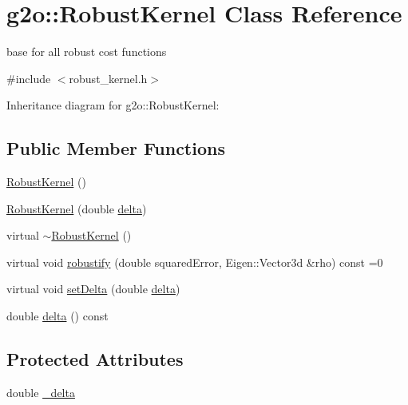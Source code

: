 \hypertarget{classg2o_1_1RobustKernel}{}\section{g2o\+:\+:Robust\+Kernel Class Reference}
\label{classg2o_1_1RobustKernel}


base for all robust cost functions  




{\ttfamily \#include $<$robust\+\_\+kernel.\+h$>$}



Inheritance diagram for g2o\+:\+:Robust\+Kernel\+:
\subsection*{Public Member Functions}
\begin{DoxyCompactItemize}
\item 
\hyperlink{classg2o_1_1RobustKernel_ae4f7b1e9d0c9925f98c0b828f554a8ab}{Robust\+Kernel} ()
\item 
\hyperlink{classg2o_1_1RobustKernel_aabd6883d9c5e33b567453585a80c7ad8}{Robust\+Kernel} (double \hyperlink{classg2o_1_1RobustKernel_a8c94f88f5c97f47c519a9adb44b4da36}{delta})
\item 
virtual \hyperlink{classg2o_1_1RobustKernel_a2d0512646603b993efdfc782df0e6df2}{$\sim$\+Robust\+Kernel} ()
\item 
virtual void \hyperlink{classg2o_1_1RobustKernel_ab47b071a0cfe466be063f0104bc41d0f}{robustify} (double squared\+Error, Eigen\+::\+Vector3d \&rho) const =0
\item 
virtual void \hyperlink{classg2o_1_1RobustKernel_a8d85269635c436fca51324d7cb16a798}{set\+Delta} (double \hyperlink{classg2o_1_1RobustKernel_a8c94f88f5c97f47c519a9adb44b4da36}{delta})
\item 
double \hyperlink{classg2o_1_1RobustKernel_a8c94f88f5c97f47c519a9adb44b4da36}{delta} () const 
\end{DoxyCompactItemize}
\subsection*{Protected Attributes}
\begin{DoxyCompactItemize}
\item 
double \hyperlink{classg2o_1_1RobustKernel_a4b03953a6e7bfca64efea37fb98548aa}{\+\_\+delta}
\end{DoxyCompactItemize}


